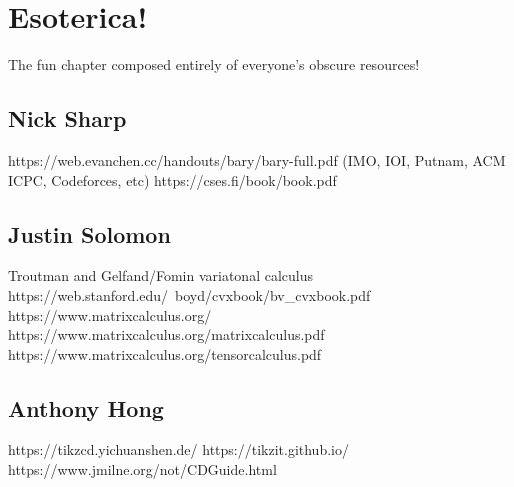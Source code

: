 \chapter{Esoterica!}

The fun chapter composed entirely of everyone's obscure resources!

\section*{Nick Sharp}
https://web.evanchen.cc/handouts/bary/bary-full.pdf
(IMO, IOI, Putnam, ACM ICPC, Codeforces, etc)
https://cses.fi/book/book.pdf

\section*{Justin Solomon}
Troutman and Gelfand/Fomin variatonal calculus
https://web.stanford.edu/~boyd/cvxbook/bv_cvxbook.pdf
https://www.matrixcalculus.org/
https://www.matrixcalculus.org/matrixcalculus.pdf
https://www.matrixcalculus.org/tensorcalculus.pdf

\section*{Anthony Hong}
https://tikzcd.yichuanshen.de/
https://tikzit.github.io/
https://www.jmilne.org/not/CDGuide.html